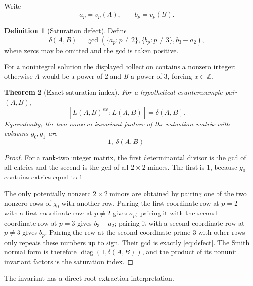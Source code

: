 \documentclass[11pt]{article}
\numberwithin{equation}{section}
\newtheorem{theorem}{Theorem}[section]
\theoremstyle{definition}
\newtheorem{definition}[theorem]{Definition}
\newcommand{\Z}{\mathbb{Z}}
\newcommand{\sat}{\operatorname{sat}}
\newcommand{\defect}{\delta}
\begin{document}
Write
\[
 a_p=v_p(A),\qquad b_p=v_p(B).
\]

\begin{definition}[Saturation defect]\label{def:defect}
Define
\begin{equation}\label{eq:defect}
 \defect(A,B)=\gcd\!\left(
   \{a_p:p\ne2\},
   \{b_p:p\ne3\},
   b_3-a_2
 \right),
\end{equation}
where zeros may be omitted and the gcd is taken positive.
\end{definition}

For a nonintegral solution the displayed collection contains a nonzero integer: otherwise \(A\) would be a power of \(2\) and \(B\) a power of \(3\), forcing \(x\in\Z\).

\begin{theorem}[Exact saturation index]\label{thm:satindex}
For a hypothetical counterexample pair \((A,B)\),
\[
   [L(A,B)^{\sat}:L(A,B)]=\defect(A,B).
\]
Equivalently, the two nonzero invariant factors of the valuation matrix with columns \(g_0,g_1\) are
\[
       1,\ \defect(A,B).
\]
\end{theorem}

\begin{proof}
For a rank-two integer matrix, the first determinantal divisor is the gcd of all entries and the second is the gcd of all \(2\times2\) minors. The first is \(1\), because \(g_0\) contains entries equal to \(1\).

The only potentially nonzero \(2\times2\) minors are obtained by pairing one of the two nonzero rows of \(g_0\) with another row. Pairing the first-coordinate row at \(p=2\) with a first-coordinate row at \(p\ne2\) gives \(a_p\); pairing it with the second-coordinate row at \(p=3\) gives \(b_3-a_2\); pairing it with a second-coordinate row at \(p\ne3\) gives \(b_p\). Pairing the row at the second-coordinate prime \(3\) with other rows only repeats these numbers up to sign. Their gcd is exactly \eqref{eq:defect}. The Smith normal form is therefore \(\operatorname{diag}(1,\defect(A,B))\), and the product of its nonunit invariant factors is the saturation index.
\end{proof}

The invariant has a direct root-extraction interpretation.
\end{document}
